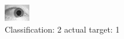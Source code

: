\begin{figure}[h!]
\begin{center}
\includegraphics[width=0.60\columnwidth]{figures/ID1442_class_2_target_1.png}
\end{center}
\caption{ Classification: 2 actual target: 1}
\label{fig:ID1442_class_2_target_1}
\end{figure}
